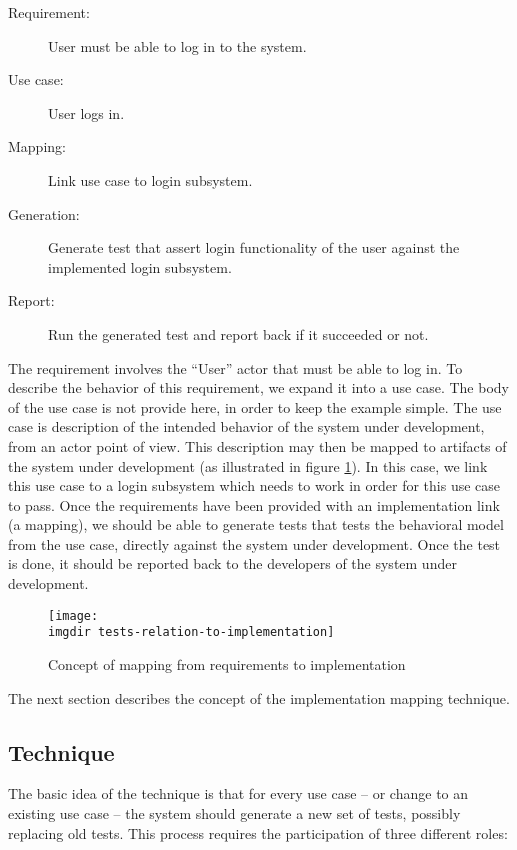 \begin{description}
  \item[Requirement:] User must be able to log in to the system.
  \item[Use case:] User logs in.
  \item[Mapping:] Link use case to login subsystem.
  \item[Generation:] Generate test that assert login functionality of the user against the implemented login subsystem.
  \item[Report:] Run the generated test and report back if it succeeded or not.
\end{description}

\noindent
The requirement involves the ``User'' actor that must be able to log in. To describe the behavior of this requirement, we expand it into a use case. The body of the use case is not provide here, in order to keep the example simple. The use case is description of the intended behavior of the system under development, from an actor point of view. This description may then be mapped to artifacts of the system under development (as illustrated in figure \ref{fig:tests-relation-to-implementation}). In this case, we link this use case to a login subsystem which needs to work in order for this use case to pass. Once the requirements have been provided with an implementation link (a mapping), we should be able to generate tests that tests the behavioral model from the use case, directly against the system under development. Once the test is done, it should be reported back to the developers of the system under development.\medskip

\begin{figure}[!htbp]
\centering
\texttt{[image: \\imgdir tests-relation-to-implementation]}
\caption{Concept of mapping from requirements to implementation}
\label{fig:tests-relation-to-implementation}
\end{figure}

\noindent
The next section describes the concept of the implementation mapping technique.

\subsection{Technique}
The basic idea of the technique is that for every use case -- or change to an existing use case -- the system should generate a new set of tests, possibly replacing old tests. This process requires the participation of three different roles:

